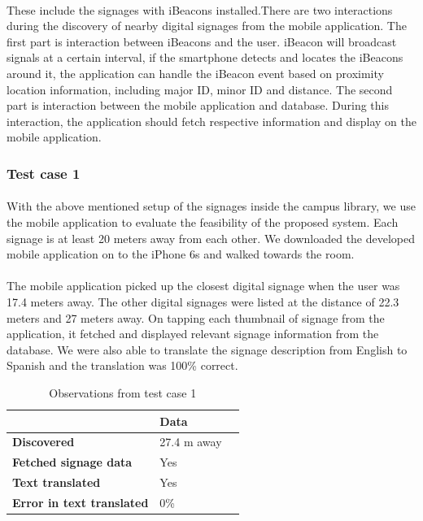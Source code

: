 \documentclass[12pt]{article}
\begin{document}
\paragraph{}These include the signages with iBeacons installed.There are two interactions during the discovery of nearby digital signages from the mobile application. The first part is interaction between iBeacons and the user. iBeacon will broadcast signals at a certain interval, if the smartphone detects and locates the iBeacons around it,  the application can handle the iBeacon event based on proximity location information, including major ID, minor ID and distance. The second part is interaction between the mobile application and database. During this interaction, the application should fetch respective information and display on the mobile application.

\subsubsection{Test case 1}
\label{oneone}
\paragraph{}With the above mentioned setup of the signages inside the campus library, we use the mobile application to evaluate the feasibility of the proposed system. Each signage is at least 20 meters away from each other. We downloaded the developed mobile application on to the iPhone 6s and walked towards the room.

\paragraph{}The mobile application picked up the closest digital signage when the user was 17.4 meters away. The other digital signages were listed at the distance of 22.3 meters and 27 meters away. On tapping each thumbnail of signage from the application, it fetched and displayed relevant signage information from the database. We were also able to translate the signage description from English to Spanish and the translation was 100\% correct.

\begin{table}%
    \centering
    \caption{Observations from test case 1} 
    \label{my-label}
       \begin{tabular}{|p{30mm}|p{35mm}|p{35mm}|}
 \hline
  & \textbf{Data}  \\ [0.5ex] 
 \hline\hline
 \textbf{Discovered} & 27.4 m away  \\ 
 \hline
 \textbf{Fetched signage data} & Yes  \\
 \hline
 \textbf{Text translated} & Yes   \\
 \hline
 \textbf{Error in text translated} & 0\%   \\ [1ex] 
 \hline
    \end{tabular}
\end{table}
\end{document}
